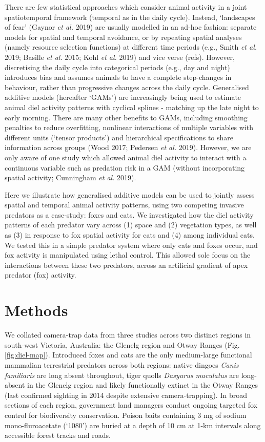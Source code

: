 \documentclass[11pt,a4paper,titlepage,twoside,openright]{style/unimelbthesis}
\begin{document}
\begin{mainmatter}
There are few statistical approaches which consider animal activity in a joint spatiotemporal framework (temporal as in the daily cycle). Instead, `landscapes of fear' (Gaynor \emph{et al.} 2019) are usually modelled in an ad-hoc fashion: separate models for spatial and temporal avoidance, or by repeating spatial analyses (namely resource selection functions) at different time periods (e.g., Smith \emph{et al.} 2019; Basille \emph{et al.} 2015; Kohl \emph{et al.} 2019) and vice verse (refs). However, discretising the daily cycle into categorical periods (e.g., day and night) introduces bias and assumes animals to have a complete step-changes in behaviour, rather than progressive changes across the daily cycle. Generalised additive models (hereafter `GAMs') are increasingly being used to estimate animal diel activity patterns with cyclical splines - matching up the late night to early morning. There are many other benefits to GAMs, including smoothing penalties to reduce overfitting, nonlinear interactions of multiple variables with different units (`tensor products') and hierarchical specifications to share information across groups (Wood 2017; Pedersen \emph{et al.} 2019). However, we are only aware of one study which allowed animal diel activity to interact with a continuous variable such as predation risk in a GAM (without incorporating spatial activity; Cunningham \emph{et al.} 2019).

Here we illustrate how generalised additive models can be used to jointly assess spatial and temporal animal activity patterns, using two competing invasive predators as a case-study: foxes and cats. We investigated how the diel activity patterns of each predator vary across (1) space and (2) vegetation types, as well as (3) in response to fox spatial activity for cats and (4) among individual cats. We tested this in a simple predator system where only cats and foxes occur, and fox activity is manipulated using lethal control. This allowed sole focus on the interactions between these two predators, across an artificial gradient of apex predator (fox) activity.

\newpage

\hypertarget{methods-3}{%
\section{Methods}\label{methods-3}}

We collated camera-trap data from three studies across two distinct regions in south-west Victoria, Australia: the Glenelg region and Otway Ranges (Fig. \ref{fig:diel-map}). Introduced foxes and cats are the only medium-large functional mammalian terrestrial predators across both regions: native dingoes \emph{Canis familiaris} are long absent throughout, tiger quolls \emph{Dasyurus maculatus} are long-absent in the Glenelg region and likely functionally extinct in the Otway Ranges (last confirmed sighting in 2014 despite extensive camera-trapping). In broad sections of each region, government land managers conduct ongoing targeted fox control for biodiversity conservation. Poison baits containing 3 mg of sodium mono-fluroacetate (`1080') are buried at a depth of 10 cm at 1-km intervals along accessible forest tracks and roads.


\end{mainmatter}
\end{document}
